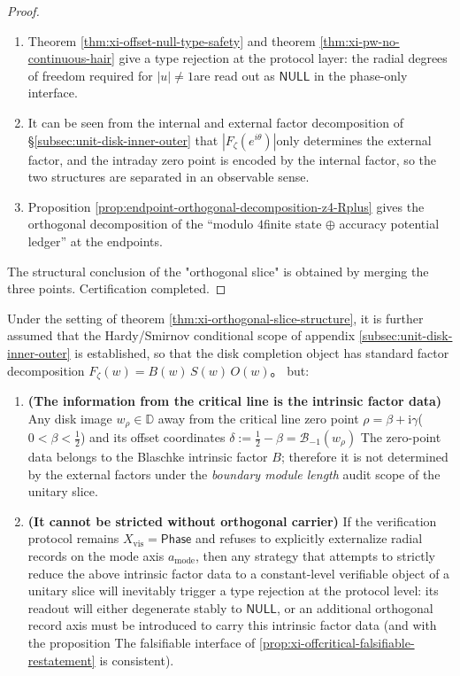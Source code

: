 \begin{proof}
\begin{enumerate}
  \item
  Theorem \ref{thm:xi-offset-null-type-safety} and theorem \ref{thm:xi-pw-no-continuous-hair} give a type rejection at the protocol layer: the radial degrees of freedom required for \(|u|\neq 1\) ​​are read out as \(\mathsf{NULL}\) in the phase-only interface.
  \item
  It can be seen from the internal and external factor decomposition of \S\ref{subsec:unit-disk-inner-outer} that \(|F_\zeta(e^{i\theta})|\) ​​only determines the external factor, and the intraday zero point is encoded by the internal factor, so the two structures are separated in an observable sense.
  \item
  Proposition \ref{prop:endpoint-orthogonal-decomposition-z4-Rplus} gives the orthogonal decomposition of the “modulo \(4\) ​​finite state \(\oplus\) accuracy potential ledger” at the endpoints.
\end{enumerate}
The structural conclusion of the "orthogonal slice" is obtained by merging the three points. Certification completed.
\end{proof}

\begin{corollary}\label{cor:xi-inner-factor-orthogonal-register}
Under the setting of theorem \ref{thm:xi-orthogonal-slice-structure}, it is further assumed that the Hardy/Smirnov conditional scope of appendix \ref{subsec:unit-disk-inner-outer} is established, so that the disk completion object has standard factor decomposition
\(
F_\zeta(w)=B(w)\,S(w)\,O(w)
\)。
but:
\begin{enumerate}
  \item ​​\textbf{(The information from the critical line is the intrinsic factor data)}
  Any disk image \(w_\rho\in\mathbb{D}\) away from the critical line zero point \(\rho=\beta+\mathrm{i}\gamma\) ​​(\(0<\beta<\tfrac12\)) and its offset coordinates
  \(
  \delta:=\tfrac12-\beta=\mathcal{B}_{-1}(w_\rho)
  \)
  The zero-point data belongs to the Blaschke intrinsic factor \(B\); therefore it is not determined by the external factors under the \emph{boundary module length} audit scope of the unitary slice.
  \item ​​\textbf{(It cannot be stricted without orthogonal carrier)}
  If the verification protocol remains \(X_{\mathrm{vis}}=\mathsf{Phase}\) and refuses to explicitly externalize radial records on the mode axis \(a_{\mathrm{mode}}\), then any strategy that attempts to strictly reduce the above intrinsic factor data to a constant-level verifiable object of a unitary slice will inevitably trigger a type rejection at the protocol level: its readout will either degenerate stably to \(\mathsf{NULL}\), or an additional orthogonal record axis must be introduced to carry this intrinsic factor data (and with the proposition The falsifiable interface of \ref{prop:xi-offcritical-falsifiable-restatement} is consistent).
\end{enumerate}
\end{corollary}

